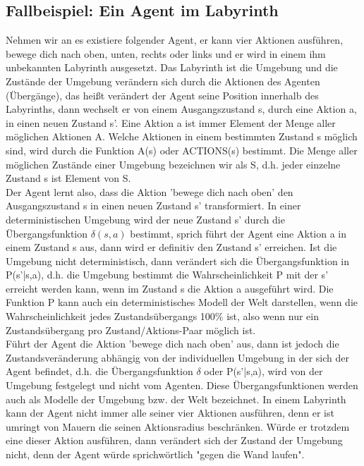 \subsection{Fallbeispiel: Ein Agent im Labyrinth}
Nehmen wir an es existiere folgender Agent, er kann vier Aktionen ausführen, bewege dich nach oben, unten, rechts oder links und er wird in einem ihm unbekannten Labyrinth ausgesetzt. Das Labyrinth ist die Umgebung und die Zustände der Umgebung verändern sich durch die Aktionen des Agenten (Übergänge), das heißt verändert der Agent seine Position innerhalb des Labyrinths, dann wechselt er von einem Ausgangszustand s, durch eine Aktion a, in einen neuen Zustand s'. Eine Aktion a ist immer Element der Menge aller möglichen Aktionen A. Welche Aktionen in einem bestimmten Zustand s möglich sind, wird durch die Funktion A(s) oder ACTIONS(s) bestimmt. Die Menge aller möglichen Zustände einer Umgebung bezeichnen wir als S, d.h. jeder einzelne Zustand s ist Element von S.\\

Der Agent lernt also, dass die Aktion 'bewege dich nach oben' den Ausgangszustand s in einen neuen Zustand s' transformiert. In einer deterministischen Umgebung wird der neue Zustand s' durch die Übergangsfunktion $\delta(s, a)$ bestimmt, sprich führt der Agent eine Aktion a in einem Zustand s aus, dann wird er definitiv den Zustand s' erreichen. Ist die Umgebung nicht deterministisch, dann verändert sich die Übergangsfunktion in P(s'|s,a), d.h. die Umgebung bestimmt die Wahrscheinlichkeit P mit der s' erreicht werden kann, wenn im Zustand s die Aktion a ausgeführt wird. Die Funktion P kann auch ein deterministisches Modell der Welt darstellen, wenn die Wahrscheinlichkeit jedes Zustandsübergangs 100\% ist, also wenn nur ein Zustandsübergang pro Zustand/Aktions-Paar möglich ist. \\

Führt der Agent die Aktion 'bewege dich nach oben' aus, dann ist jedoch die Zustandsveränderung abhängig von der individuellen Umgebung in der sich der Agent befindet, d.h. die Übergangsfunktion $\delta$ oder P(s'|s,a), wird von der Umgebung festgelegt und nicht vom Agenten. Diese Übergangsfunktionen werden auch als Modelle der Umgebung bzw. der Welt bezeichnet. In einem Labyrinth kann der Agent nicht immer alle seiner vier Aktionen ausführen, denn er ist umringt von Mauern die seinen Aktionsradius beschränken. Würde er trotzdem eine dieser Aktion ausführen, dann verändert sich der Zustand der Umgebung nicht, denn der Agent würde sprichwörtlich "gegen die Wand laufen". \\

